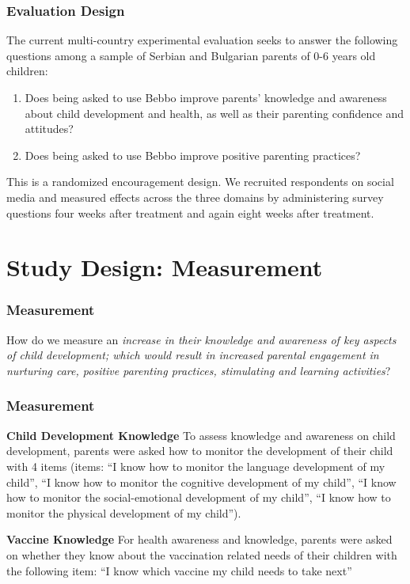 \documentclass[aspectratio=169]{beamer}
\begin{document}
\begin{frame}
\frametitle{Evaluation Design}

The current multi-country experimental evaluation seeks to answer the following questions among a sample of Serbian and Bulgarian parents of 0-6 years old children:  

\begin{enumerate}
\item Does being asked to use Bebbo improve parents’ knowledge and awareness about child development and health, as well as their parenting confidence and attitudes?
\item Does being asked to use Bebbo improve positive parenting practices?
\end{enumerate}

This is a randomized encouragement design. We recruited respondents on social media and measured effects across the three domains by administering survey questions four weeks after treatment and again eight weeks after treatment. 

\end{frame}


\section{Study Design: Measurement}

\begin{frame}
\frametitle{Measurement}
How do we measure an \emph{increase in their knowledge and awareness of key aspects of child development; which would result in increased parental engagement in nurturing care, positive parenting practices, stimulating and learning activities}?

\end{frame}

\begin{frame}
  \frametitle{Measurement}

\textbf{Child Development Knowledge}
To assess knowledge and awareness on child development, parents were asked how to monitor the development of their child with 4 items (items: “I know how to monitor the language development of my child”, “I know how to monitor the cognitive development of my child”, “I know how to monitor the social-emotional development of my child”, “I know how to monitor the physical development of my child”).

\textbf{Vaccine Knowledge}
For health awareness and knowledge, parents were asked on whether they know about the vaccination related needs of their children with the following item: “I know which vaccine my child needs to take next” 

\end{frame}
\end{document}
